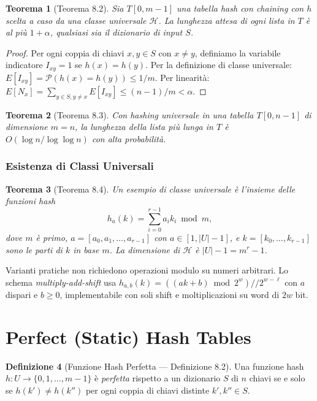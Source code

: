 \documentclass[12pt, a4paper, oneside]{book}
\theoremstyle{plain}
\newtheorem{teorema}{Teorema}[chapter]
\theoremstyle{definition}
\newtheorem{definizione}[teorema]{Definizione}
\theoremstyle{remark}
\begin{document}
\begin{teorema}[Teorema 8.2]
Sia $T[0, m-1]$ una tabella hash con chaining con $h$ scelta a caso da una classe universale $\mathcal{H}$. La lunghezza attesa di ogni lista in $T$ è al più $1 + \alpha$, qualsiasi sia il dizionario di input $S$.
\end{teorema}

\begin{proof}
Per ogni coppia di chiavi $x, y \in S$ con $x \ne y$, definiamo la variabile indicatore $I_{xy} = 1$ se $h(x) = h(y)$. Per la definizione di classe universale: $E[I_{xy}] = \mathcal{P}(h(x) = h(y)) \le 1/m$. Per linearità:
$E[N_x] = \sum_{y \in S, y \ne x} E[I_{xy}] \le (n-1)/m < \alpha$.
\end{proof}

\begin{teorema}[Teorema 8.3]
Con hashing universale in una tabella $T[0, n-1]$ di dimensione $m = n$, la lunghezza della lista più lunga in $T$ è $O(\log n / \log\log n)$ con alta probabilità.
\end{teorema}

\subsubsection{Esistenza di Classi Universali}

\begin{teorema}[Teorema 8.4]
Un esempio di classe universale è l'insieme delle funzioni hash
\[
h_a(k) = \sum_{i=0}^{r-1} a_i k_i \bmod m,
\]
dove $m$ è primo, $a = [a_0, a_1, \ldots, a_{r-1}]$ con $a \in [1, |U|-1]$, e $k = [k_0, \ldots, k_{r-1}]$ sono le parti di $k$ in base $m$. La dimensione di $\mathcal{H}$ è $|U| - 1 = m^r - 1$.
\end{teorema}

Varianti pratiche non richiedono operazioni modulo su numeri arbitrari. Lo schema \emph{multiply-add-shift} usa $h_{a,b}(k) = ((ak + b) \bmod 2^w) \mathbin{/\!\!/} 2^{w-\ell}$ con $a$ dispari e $b \ge 0$, implementabile con soli shift e moltiplicazioni su word di $2w$ bit.

\section{Perfect (Static) Hash Tables}

\begin{definizione}[Funzione Hash Perfetta --- Definizione 8.2]
Una funzione hash $h : U \to \{0, 1, \ldots, m-1\}$ è \emph{perfetta} rispetto a un dizionario $S$ di $n$ chiavi se e solo se $h(k') \ne h(k'')$ per ogni coppia di chiavi distinte $k', k'' \in S$.
\end{definizione}
\end{document}

